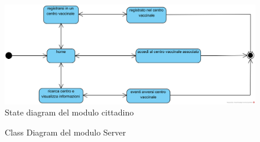 \begin{figure}[h]
	\includegraphics[width=\textwidth]{./img/StateMachineDiagramCittadini}
	\caption{State diagram del modulo cittadino}
\end{figure}

\begin{figure}[p]
	\caption{Class Diagram del modulo Server}
	\label{fig:classDiagramServer}
\end{figure}